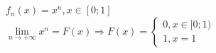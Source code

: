 \begin{Example}~\\
	\begin{figure}[h]
		\begin{minipage}[h]{0.55\linewidth}
		\end{minipage}
		\hfill
		\begin{minipage}[h]{0.55\linewidth}
		\end{minipage}
	\end{figure}\\
	$f_n(x) = x^n, x \in [0;1]$\\
	$\lim\limits_{n \to +\infty}x^n = F(x) \Rightarrow F(x) = 
	\begin{cases}
	0, x \in [0;1)\\
	1, x=1
	\end{cases}$
\end{Example}

